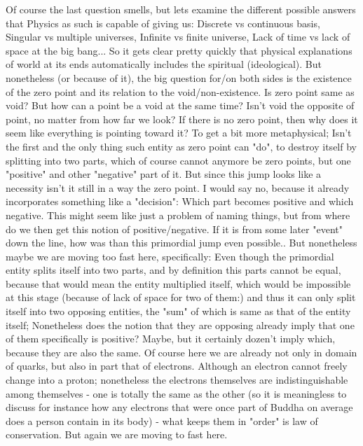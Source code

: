 \documentclass[10pt]{book}
\begin{document}
Of course the last question smells, but lets examine the different possible answers that Physics as such is capable of giving us: Discrete vs continuous basis, Singular vs multiple universes, Infinite vs finite universe, Lack of time vs lack of space at the big bang... So it gets clear pretty quickly that physical explanations of world at its ends automatically includes the spiritual (ideological).
But nonetheless (or because of it), the big question for/on both sides is the existence of the zero point and its relation to the void/non-existence. Is zero point same as void? But how can a point be a void at the same time? Isn't void the opposite of point, no matter from how far we look? If there is no zero point, then why does it seem like everything is pointing toward it?
To get a bit more metaphysical; Isn't the first and the only thing such entity as zero point can "do", to destroy itself by splitting into two parts, which of course cannot anymore be zero points, but one "positive" and other "negative" part of it. But since this jump looks like a necessity isn't it still in a way the zero point. I would say no, because it already incorporates something like a "decision": Which part becomes positive and which negative. This might seem like just a problem of naming things, but from where do we then get this notion of positive/negative. If it is from some later "event" down the line, how was than this primordial jump even possible.. But nonetheless maybe we are moving too fast here, specifically: Even though the primordial entity splits itself into two parts, and by definition this parts cannot be equal, because that would mean the entity multiplied itself, which would be impossible at this stage (because of lack of space for two of them:) and thus it can only split itself into two opposing entities, the "sum" of which is same as that of the entity itself; Nonetheless does the notion that they are opposing already imply that one of them specifically is positive? Maybe, but it certainly dozen't imply which, because they are also the same. Of course here we are already not only in domain of quarks, but also in part that of electrons. Although an electron cannot freely change into a proton; nonetheless the electrons themselves are indistinguishable among themselves - one is totally the same as the other (so it is meaningless to discuss for instance how any electrons that were once part of Buddha on average does a person contain in its body) - what keeps them in "order" is law of conservation. But again we are moving to fast here. 
\end{document}
